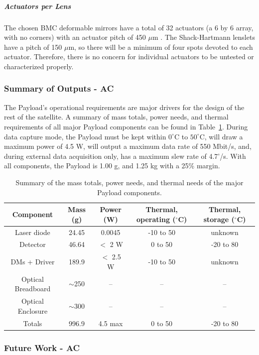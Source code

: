 \documentclass[12pt]{article}
\begin{document}
				\subparagraph{Actuators per Lens}
The chosen BMC deformable mirrors have a total of 32 actuators (a 6 by 6 array, with no corners) with an actuator pitch of 450 $\mu$m \cite{BMC}.  The Shack-Hartmann lenslets have a pitch of 150 $\mu$m, so there will be a minimum of four spots devoted to each actuator.  Therefore, there is no concern for individual actuators to be untested or characterized properly.

			\subsubsection{Summary of Outputs - AC}

The Payload's operational requirements are major drivers for the design of the rest of the satellite. A summary of mass totals, power needs, and thermal requirements of all major Payload components can be found in Table~\ref{fig:payload_summary_table}.  
During data capture mode, the Payload must be kept within $0^\circ$C to $50^\circ$C, will draw a maximum power of 4.5 W, will output a maximum data rate of 550 Mbit/s, and, during external data acquisition only, has a maximum slew rate of 4.7'/s. 
With all components, the Payload is 1.00 g, and 1.25 kg with a 25\% margin.  

\begin{table}
\caption{Summary of the mass totals, power needs, and thermal needs of the major Payload components.}
\begin{tabular}{|c||c|c|c|c|} \hline
	\textbf{Component} & \textbf{Mass (g)} & \textbf{Power (W)} & \textbf{Thermal, operating ($^\circ$C)} & \textbf{Thermal, storage ($^\circ$C)} \\ \hline \hline
Laser diode & 24.45 & 0.0045 & -10 to 50 & unknown \\
Detector & 46.64 & $<$ 2 W & 0 to 50 & -20 to 80 \\
DMs + Driver & 189.9 & $<$ 2.5 W & -10 to 50 & unknown \\
Optical Breadboard & $\sim$250 & -- & -- & -- \\
Optical Enclosure & $\sim$300 & -- & -- & -- \\ \hline \hline
Totals & 996.9 & 4.5 max & 0 to 50 & -20 to 80 \\ \hline
\end{tabular}\label{fig:payload_summary_table}
\end{table}

			\subsubsection{Future Work - AC}
\end{document}
